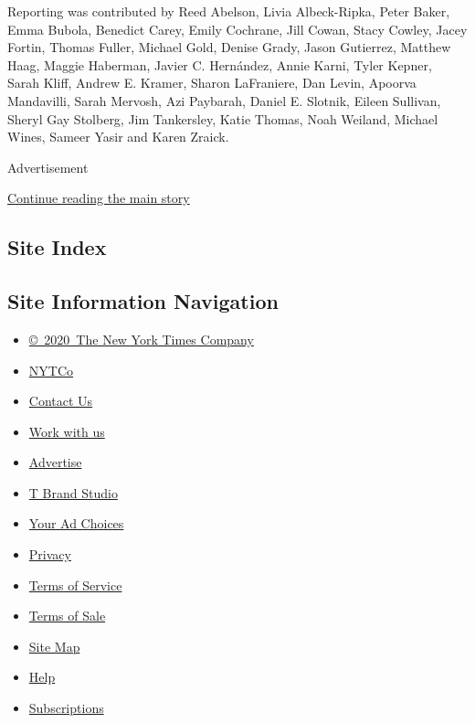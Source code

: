 Reporting was contributed by Reed Abelson, Livia Albeck-Ripka, Peter
Baker, Emma Bubola, Benedict Carey, Emily Cochrane, Jill Cowan, Stacy
Cowley, Jacey Fortin, Thomas Fuller, Michael Gold, Denise Grady, Jason
Gutierrez, Matthew Haag, Maggie Haberman, Javier C. Hernández, Annie
Karni, Tyler Kepner, Sarah Kliff, Andrew E. Kramer, Sharon LaFraniere,
Dan Levin, Apoorva Mandavilli, Sarah Mervosh, Azi Paybarah, Daniel E.
Slotnik, Eileen Sullivan, Sheryl Gay Stolberg, Jim Tankersley, Katie
Thomas, Noah Weiland, Michael Wines, Sameer Yasir and Karen Zraick.

Advertisement

\protect\hyperlink{after-bottom}{Continue reading the main story}

\hypertarget{site-index}{%
\subsection{Site Index}\label{site-index}}

\hypertarget{site-information-navigation}{%
\subsection{Site Information
Navigation}\label{site-information-navigation}}

\begin{itemize}
\tightlist
\item
  \href{https://help.nytimes3xbfgragh.onion/hc/en-us/articles/115014792127-Copyright-notice}{©~2020~The
  New York Times Company}
\end{itemize}

\begin{itemize}
\tightlist
\item
  \href{https://www.nytco.com/}{NYTCo}
\item
  \href{https://help.nytimes3xbfgragh.onion/hc/en-us/articles/115015385887-Contact-Us}{Contact
  Us}
\item
  \href{https://www.nytco.com/careers/}{Work with us}
\item
  \href{https://nytmediakit.com/}{Advertise}
\item
  \href{http://www.tbrandstudio.com/}{T Brand Studio}
\item
  \href{https://www.nytimes3xbfgragh.onion/privacy/cookie-policy\#how-do-i-manage-trackers}{Your
  Ad Choices}
\item
  \href{https://www.nytimes3xbfgragh.onion/privacy}{Privacy}
\item
  \href{https://help.nytimes3xbfgragh.onion/hc/en-us/articles/115014893428-Terms-of-service}{Terms
  of Service}
\item
  \href{https://help.nytimes3xbfgragh.onion/hc/en-us/articles/115014893968-Terms-of-sale}{Terms
  of Sale}
\item
  \href{https://spiderbites.nytimes3xbfgragh.onion}{Site Map}
\item
  \href{https://help.nytimes3xbfgragh.onion/hc/en-us}{Help}
\item
  \href{https://www.nytimes3xbfgragh.onion/subscription?campaignId=37WXW}{Subscriptions}
\end{itemize}
